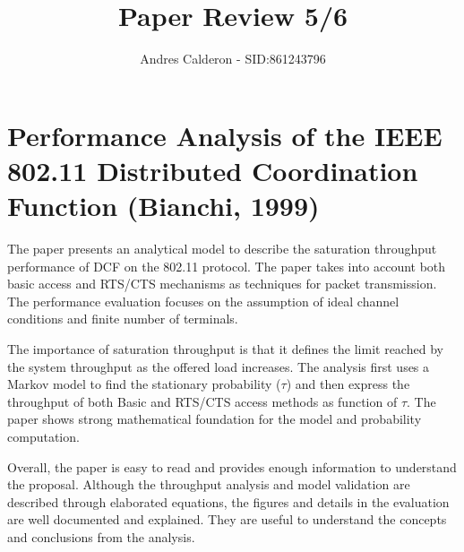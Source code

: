 \documentclass[a4paper,10pt]{scrartcl}
\title{Paper Review 5/6}
\author{Andres Calderon - SID:861243796}
\begin{document}
\maketitle
\thispagestyle{empty}

\section*{Performance Analysis of the IEEE 802.11 Distributed Coordination Function (Bianchi, 1999)}
The paper presents an analytical model to describe the saturation throughput performance of DCF on the 802.11 protocol.  The paper takes into account both basic access and RTS/CTS mechanisms as techniques for packet transmission.  The performance evaluation focuses on the assumption of ideal channel conditions and finite number of terminals.

The importance of saturation throughput is that it defines the limit reached by the system throughput as the offered load increases. The analysis first uses a Markov model to find the stationary probability ($\tau$) and then express the throughput of both Basic and RTS/CTS access methods as function of $\tau$.  The paper shows strong mathematical foundation for the model and probability computation.

Overall, the paper is easy to read and provides enough information to understand the proposal.  Although the throughput analysis and model validation are described through elaborated equations, the figures and details in the evaluation are well documented and explained.  They are useful to understand the concepts and conclusions from the analysis.

\end{document}

